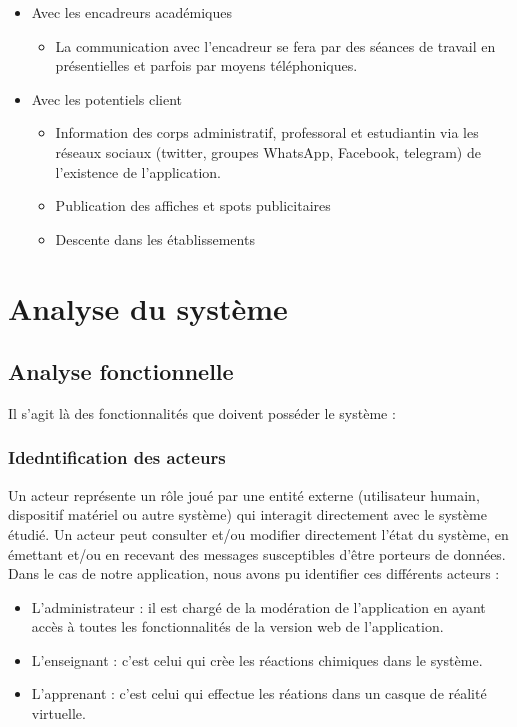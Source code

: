 \begin{itemize}
	\item Avec les encadreurs académiques
	      \begin{itemize}
		      \item La communication avec l’encadreur se fera par des séances de travail en présentielles et parfois par moyens téléphoniques.
	      \end{itemize}
	\item Avec les potentiels client
	      \begin{itemize}
		      \item Information des corps administratif, professoral et estudiantin via les réseaux sociaux (twitter, groupes WhatsApp, Facebook, telegram) de l’existence de l’application.
		      \item Publication des affiches et spots publicitaires
		      \item Descente dans les établissements
	      \end{itemize}
\end{itemize}

\section{Analyse du système}

\subsection{Analyse fonctionnelle} %
\label{sub:analyse-fonctionnelle}

Il s’agit là des fonctionnalités que doivent posséder le système :

\subsubsection{Idedntification des acteurs} %
\label{ssub:Idedntification-des-acteurs}


Un acteur représente un rôle joué par une entité externe (utilisateur humain, dispositif matériel ou autre système) qui interagit directement avec le système étudié. Un acteur peut consulter et/ou modifier directement l’état du système, en émettant et/ou en recevant des messages susceptibles d’être porteurs de données. Dans le cas de notre application, nous avons pu identifier ces différents acteurs :

\begin{itemize}
	\item L’administrateur : il est chargé de la modération de l'application en ayant accès à toutes les fonctionnalités de la version web de l'application.
	\item L’enseignant : c'est celui qui crèe les réactions chimiques dans le système.
	\item L’apprenant : c'est celui qui effectue les réations dans un casque de réalité virtuelle.
\end{itemize}

